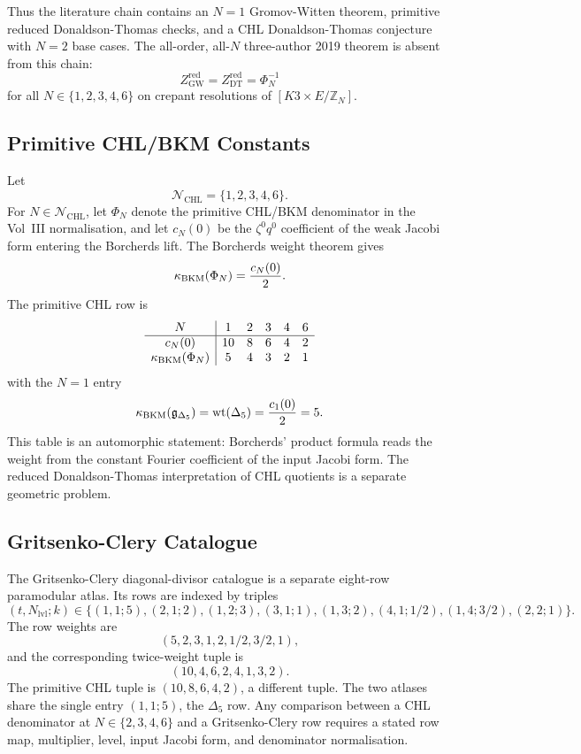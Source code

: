 Thus the literature chain contains an $N=1$ Gromov-Witten theorem,
primitive reduced Donaldson-Thomas checks, and a CHL
Donaldson-Thomas conjecture with $N=2$ base cases.  The all-order,
all-$N$ three-author 2019 theorem is absent from this chain:
\[
 Z^{\mathrm{red}}_{\mathrm{GW}}
 =
 Z^{\mathrm{red}}_{\mathrm{DT}}
 =
 \Phi_N^{-1}
\]
for all $N\in\{1,2,3,4,6\}$ on crepant resolutions of
$[K3\times E/\mathbb{Z}_N]$.

\subsection*{Primitive CHL/BKM Constants}

Let
\[
 \mathcal{N}_{\mathrm{CHL}}=\{1,2,3,4,6\}.
\]
For $N\in\mathcal{N}_{\mathrm{CHL}}$, let $\Phi_N$ denote the primitive
CHL/BKM denominator in the Vol~III normalisation, and let $c_N(0)$ be
the $\zeta^0q^0$ coefficient of the weak Jacobi form entering the
Borcherds lift.  The Borcherds weight theorem gives
\[
 \kappa_{\mathrm{BKM}}(\Phi_N)=\frac{c_N(0)}{2}.
\]
The primitive CHL row is
\[
\begin{array}{c|ccccc}
N & 1 & 2 & 3 & 4 & 6\\
\hline
c_N(0) & 10 & 8 & 6 & 4 & 2\\
\kappa_{\mathrm{BKM}}(\Phi_N) & 5 & 4 & 3 & 2 & 1
\end{array}
\]
with the $N=1$ entry
\[
 \kappa_{\mathrm{BKM}}(\mathfrak g_{\Delta_5})
 =
 \operatorname{wt}(\Delta_5)
 =
 \frac{c_1(0)}{2}
 =
 5.
\]
This table is an automorphic statement: Borcherds' product formula
reads the weight from the constant Fourier coefficient of the input
Jacobi form.  The reduced Donaldson-Thomas interpretation of CHL
quotients is a separate geometric problem.

\subsection*{Gritsenko-Clery Catalogue}

The Gritsenko-Clery diagonal-divisor catalogue is a separate eight-row
paramodular atlas.  Its rows are indexed by triples
\[
 (t,N_{\mathrm{lvl}};k)\in
 \{(1,1;5),(2,1;2),(1,2;3),(3,1;1),
 (1,3;2),(4,1;1/2),(1,4;3/2),(2,2;1)\}.
\]
The row weights are
\[
 (5,2,3,1,2,1/2,3/2,1),
\]
and the corresponding twice-weight tuple is
\[
 (10,4,6,2,4,1,3,2).
\]
The primitive CHL tuple is $(10,8,6,4,2)$, a different tuple.  The two
atlases share the single entry $(1,1;5)$, the $\Delta_5$ row.  Any
comparison between a CHL denominator at $N\in\{2,3,4,6\}$ and a
Gritsenko-Clery row requires a stated row map, multiplier, level, input
Jacobi form, and denominator normalisation.

